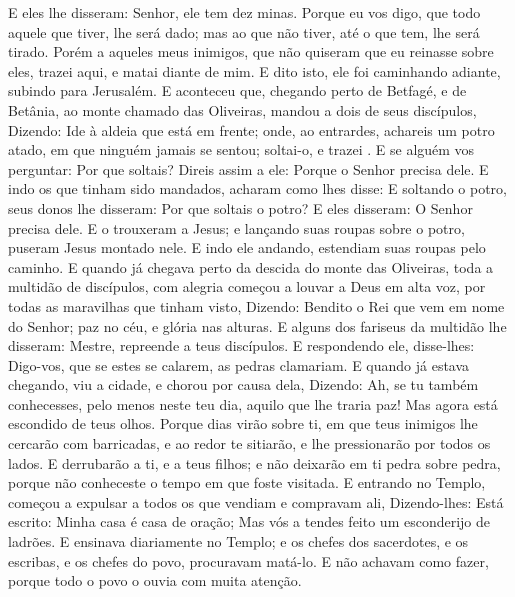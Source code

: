 {  E eles lhe disseram: Senhor, ele
{} tem dez minas.
   Porque eu vos digo, que todo aquele que tiver, lhe será dado; mas ao que não tiver, até o que tem, lhe será tirado.
  Porém a aqueles meus inimigos, que não quiseram que eu reinasse sobre eles, trazei
{} aqui, e matai
{} diante de mim.
  E dito isto, ele foi caminhando adiante, subindo para Jerusalém.
  E aconteceu que, chegando perto de Betfagé, e de Betânia, ao monte chamado das Oliveiras, mandou a dois de seus discípulos,
  Dizendo: Ide à aldeia que está em frente; onde, ao entrardes, achareis um potro atado, em que ninguém jamais se sentou; soltai-o, e trazei
{} .
  E se alguém vos perguntar: Por que
{} soltais? Direis assim a ele: Porque o Senhor precisa dele.
  E indo os que tinham sido mandados, acharam como lhes disse:
  E soltando o potro, seus donos lhe disseram: Por que soltais o potro?
  E eles disseram: O Senhor precisa dele.
  E o trouxeram a Jesus; e lançando suas roupas sobre o potro, puseram Jesus montado nele.
  E indo ele andando, estendiam suas roupas pelo caminho.
  E quando já chegava perto da descida do monte das Oliveiras, toda a multidão de discípulos, com alegria começou a louvar a Deus em alta voz, por todas as maravilhas que tinham visto,
  Dizendo: Bendito o Rei que vem em nome do Senhor; paz no céu, e glória nas alturas.
  E alguns dos fariseus da multidão lhe disseram: Mestre, repreende a teus discípulos.
  E respondendo ele, disse-lhes: Digo-vos, que se estes se calarem, as pedras clamariam.
  E quando já estava chegando, viu a cidade, e chorou por causa dela,
  Dizendo: Ah, se tu também conhecesses, pelo menos neste teu dia, aquilo que lhe traria paz! Mas agora
{} está escondido de teus olhos.
  Porque dias virão sobre ti, em que teus inimigos lhe cercarão com barricadas, e ao redor te sitiarão, e lhe pressionarão por todos os lados.
  E derrubarão a ti, e a teus filhos; e não deixarão em ti pedra sobre pedra, porque não conheceste o tempo em que foste visitada.
  E entrando no Templo, começou a expulsar a todos os que vendiam e compravam ali,
  Dizendo-lhes: Está escrito: Minha casa é casa de oração; Mas vós a tendes feito um esconderijo de ladrões.
  E ensinava diariamente no Templo; e os chefes dos sacerdotes, e os escribas, e os chefes do povo, procuravam matá-lo.
  E não achavam como fazer, porque todo o povo o ouvia com muita atenção.
\par }

